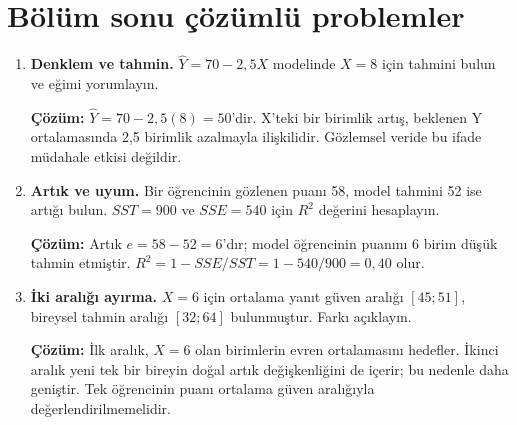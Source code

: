 \section{Bölüm sonu çözümlü problemler}

\begin{enumerate}
  \item \textbf{Denklem ve tahmin.} $\widehat Y=70-2{,}5X$ modelinde $X=8$ için tahmini bulun ve eğimi yorumlayın.

  \textbf{Çözüm:} $\widehat Y=70-2{,}5(8)=50$'dir. X'teki bir birimlik artış, beklenen Y ortalamasında 2,5 birimlik azalmayla ilişkilidir. Gözlemsel veride bu ifade müdahale etkisi değildir.

  \item \textbf{Artık ve uyum.} Bir öğrencinin gözlenen puanı 58, model tahmini 52 ise artığı bulun. $SST=900$ ve $SSE=540$ için $R^2$ değerini hesaplayın.

  \textbf{Çözüm:} Artık $e=58-52=6$'dır; model öğrencinin puanını 6 birim düşük tahmin etmiştir. $R^2=1-SSE/SST=1-540/900=0{,}40$ olur.

  \item \textbf{İki aralığı ayırma.} $X=6$ için ortalama yanıt güven aralığı $[45;51]$, bireysel tahmin aralığı $[32;64]$ bulunmuştur. Farkı açıklayın.

  \textbf{Çözüm:} İlk aralık, $X=6$ olan birimlerin evren ortalamasını hedefler. İkinci aralık yeni tek bir bireyin doğal artık değişkenliğini de içerir; bu nedenle daha geniştir. Tek öğrencinin puanı ortalama güven aralığıyla değerlendirilmemelidir.
\end{enumerate}